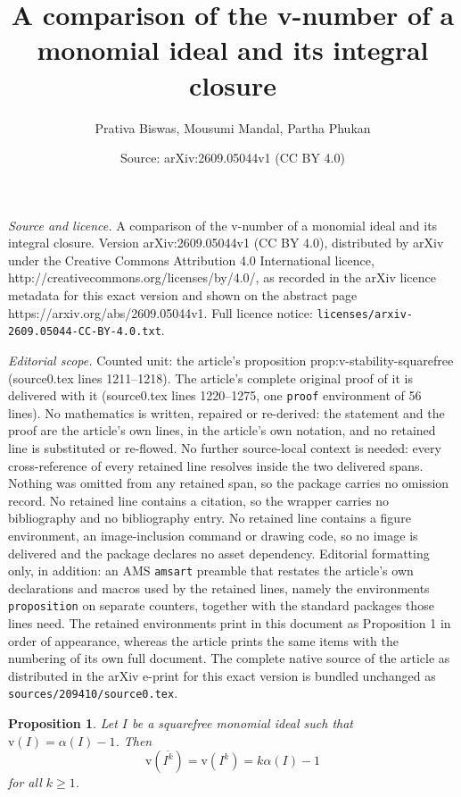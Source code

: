 \documentclass[10pt,a4paper]{amsart}
\title{A comparison of the v-number of a monomial ideal and its integral closure}
\author{Prativa Biswas, Mousumi Mandal, Partha Phukan}
\date{Source: arXiv:2609.05044v1 (CC BY 4.0)}
\newtheorem{proposition}{Proposition}
\begin{document}
\maketitle

\noindent\emph{Source and licence.} A comparison of the v-number of a monomial ideal and its integral closure. Version arXiv:2609.05044v1 (CC BY 4.0), distributed by arXiv under the Creative Commons Attribution 4.0 International licence, http://creativecommons.org/licenses/by/4.0/, as recorded in the arXiv licence metadata for this exact version and shown on the abstract page https://arxiv.org/abs/2609.05044v1. Full licence notice: \texttt{licenses/arxiv-2609.05044-CC-BY-4.0.txt}.\par\smallskip

\noindent\textit{Editorial scope.} Counted unit: the article's proposition prop:v-stability-squarefree (source0.tex lines 1211--1218). The article's complete original proof of it is delivered with it (source0.tex lines 1220--1275, one \texttt{proof} environment of 56 lines). No mathematics is written, repaired or re-derived: the statement and the proof are the article's own lines, in the article's own notation, and no retained line is substituted or re-flowed.  No further source-local context is needed: every cross-reference of every retained line resolves inside the two delivered spans.  Nothing was omitted from any retained span, so the package carries no omission record.  No retained line contains a citation, so the wrapper carries no bibliography and no bibliography entry.  No retained line contains a figure environment, an image-inclusion command or drawing code, so no image is delivered and the package declares no asset dependency.  Editorial formatting only, in addition: an AMS \texttt{amsart} preamble that restates the article's own declarations and macros used by the retained lines, namely the environments \texttt{proposition} on separate counters, together with the standard packages those lines need.  The retained environments print in this document as Proposition 1 in order of appearance, whereas the article prints the same items with the numbering of its own full document.  The complete native source of the article as distributed in the arXiv e-print for this exact version is bundled unchanged as \texttt{sources/209410/source0.tex}.
\begin{proposition}
\label{prop:v-stability-squarefree}
Let \(I\) be a squarefree monomial ideal such that \(\mathrm{v}(I) = \alpha(I) - 1\). Then
\[
\mathrm{v}(\overline{I^k}) = \mathrm{v}(I^k) = k\alpha(I) - 1
\]
for all \(k \ge 1\).
\end{proposition}
\end{document}

